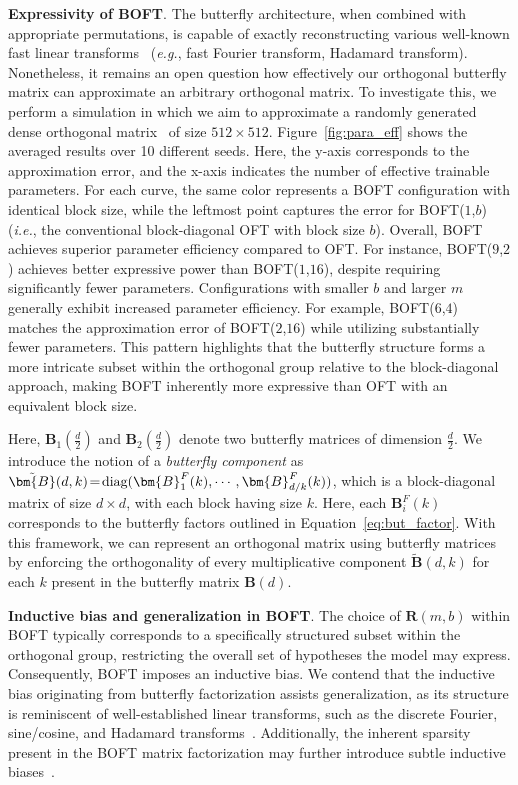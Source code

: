 \textbf{Expressivity of BOFT}. The butterfly architecture, when combined with appropriate permutations, is capable of exactly reconstructing various well-known fast linear transforms~\cite{dao2019learning,dao2019kaleidoscope} (\emph{e.g.}, fast Fourier transform, Hadamard transform). Nonetheless, it remains an open question how effectively our orthogonal butterfly matrix can approximate an arbitrary orthogonal matrix. To investigate this, we perform a simulation in which we aim to approximate a randomly generated dense orthogonal matrix~\cite{anderson1987generation} of size $512\times 512$. Figure~\ref{fig:para_eff} shows the averaged results over 10 different seeds. Here, the y-axis corresponds to the approximation error, and the x-axis indicates the number of effective trainable parameters. For each curve, the same color represents a BOFT configuration with identical block size, while the leftmost point captures the error for BOFT($1$,$b$) (\emph{i.e.}, the conventional block-diagonal OFT with block size $b$). Overall, BOFT achieves superior parameter efficiency compared to OFT. For instance, BOFT($9$,$2$) achieves better expressive power than BOFT($1$,$16$), despite requiring significantly fewer parameters. Configurations with smaller $b$ and larger $m$ generally exhibit increased parameter efficiency. For example, BOFT($6$,$4$) matches the approximation error of BOFT($2$,$16$) while utilizing substantially fewer parameters. This pattern highlights that the butterfly structure forms a more intricate subset within the orthogonal group relative to the block-diagonal approach, making BOFT inherently more expressive than OFT with an equivalent block size.

Here, $\bm{B}_1(\frac{d}{2})$ and $\bm{B}_2(\frac{d}{2})$ denote two butterfly matrices of dimension $\frac{d}{2}$. We introduce the notion of a \emph{butterfly component} as $\thickmuskip=2mu \medmuskip=2mu \tilde{\bm{B}}(d,k)=\text{diag}(\bm{B}^F_1(k),\cdots,\bm{B}^F_{d/k}(k))$, which is a block-diagonal matrix of size $d\times d$, with each block having size $k$. Here, each $\bm{B}^F_i(k)$ corresponds to the butterfly factors outlined in Equation~\ref{eq:but_factor}. With this framework, we can represent an orthogonal matrix using butterfly matrices by enforcing the orthogonality of every multiplicative component $\tilde{\bm{B}}(d,k)$ for each $k$ present in the butterfly matrix $\bm{B}(d)$. 

\textbf{Inductive bias and generalization in BOFT}. The choice of $\bm{R}(m,b)$ within BOFT typically corresponds to a specifically structured subset within the orthogonal group, restricting the overall set of hypotheses the model may express. Consequently, BOFT imposes an inductive bias. We contend that the inductive bias originating from butterfly factorization assists generalization, as its structure is reminiscent of well-established linear transforms, such as the discrete Fourier, sine/cosine, and Hadamard transforms~\cite{dao2019kaleidoscope}. Additionally, the inherent sparsity present in the BOFT matrix factorization may further introduce subtle inductive biases~\cite{gunasekar2017implicit,li2018algorithmic,liu2019neural}.

